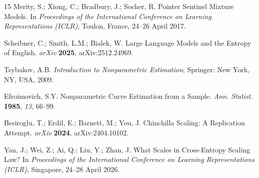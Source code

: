 \documentclass[entropy,article,submit,moreauthors,pdftex]{Definitions/mdpi}
\begin{document}
\begin{thebibliography}{15}
Merity, S.; Xiong, C.; Bradbury, J.; Socher, R. Pointer Sentinel Mixture Models. In \textit{Proceedings of the International Conference on Learning Representations (ICLR)}, Toulon, France, 24--26 April 2017.

Scheibner, C.; Smith, L.M.; Bialek, W. Large Language Models and the Entropy of English. \textit{arXiv} \textbf{2025}, arXiv:2512.24969.

Tsybakov, A.B. \textit{Introduction to Nonparametric Estimation}; Springer: New York, NY, USA, 2009.

Efroimovich, S.Y. Nonparametric Curve Estimation from a Sample. \textit{Ann. Statist.} \textbf{1985}, \textit{13}, 66--99.

Besiroglu, T.; Erdil, E.; Barnett, M.; You, J. Chinchilla Scaling: A Replication Attempt. \textit{arXiv} \textbf{2024}, arXiv:2404.10102.

Yan, J.; Wei, Z.; Ai, Q.; Liu, Y.; Zhan, J. What Scales in Cross-Entropy Scaling Law? In \textit{Proceedings of the International Conference on Learning Representations (ICLR)}, Singapore, 24--28 April 2026.

\end{thebibliography}
\end{document}
